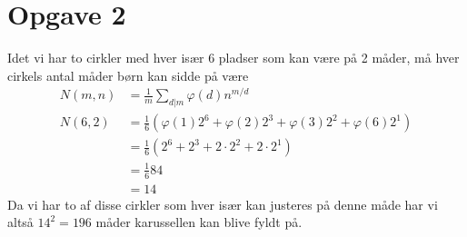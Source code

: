 \documentclass[12pt]{article}
\author{Nikolaj Dybdahl Rathcke}
\begin{document}
\section*{Opgave 2}
Idet vi har to cirkler med hver især 6 pladser som kan være på 2 måder, må hver cirkels antal måder børn kan sidde på være
\begin{align*}
N(m,n)&=\frac{1}{m}\sum_{d|m}\varphi(d)n^{m/d} \\
N(6,2)&=\frac{1}{6}(\varphi(1)2^6+\varphi(2)2^3+\varphi(3)2^2+\varphi(6)2^1) \\
&=\frac{1}{6}(2^6+2^3+2\cdot 2^2+2\cdot 2^1) \\
&=\frac{1}{6}84 \\
&=14
\end{align*}
Da vi har to af disse cirkler som hver især kan justeres på denne måde har vi altså $14^2=196$ måder karussellen kan blive fyldt på.
\end{document}
